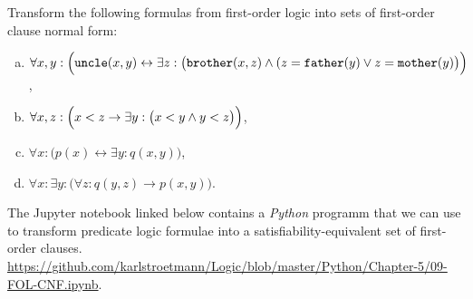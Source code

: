\exerciseEng
Transform the following formulas from first-order logic into sets of first-order clause normal form:
\begin{enumerate}[(a)]
\item $\forall x, y: \Bigl(\mathtt{uncle}(x,y) \leftrightarrow
       \exists z: \bigl(\mathtt{brother}(x,z) \wedge (z = \mathtt{father}(y) \vee z = \mathtt{mother}(y)
       \bigr)\Bigr)$,
\item $\forall x, z: \Bigl(x < z \rightarrow \exists y: \bigl(x < y \wedge y < z\bigr)\Bigr)$,
\item $\forall x: \bigl(p(x) \leftrightarrow \exists y: q(x,y) \bigr)$, 
\item $\forall x: \exists y: \bigl(\forall z:q(y,z) \rightarrow p(x,y)\bigr)$. \eox
\end{enumerate}%
\vspace*{-0.1cm}

\noindent
The Jupyter notebook linked below contains a \textsl{Python} programm that we can use to transform predicate
logic formulae into a satisfiability-equivalent set of first-order clauses. 
\\[0.2cm]
\hspace*{0.3cm}
\href{https://github.com/karlstroetmann/Logic/blob/master/Python/Chapter-5/09-FOL-CNF.ipynb}{https://github.com/karlstroetmann/Logic/blob/master/Python/Chapter-5/09-FOL-CNF.ipynb}.
\vspace*{0.2cm}

